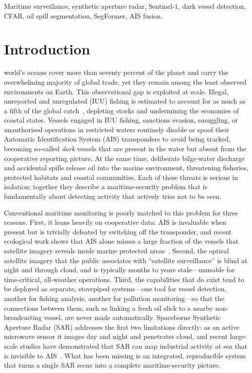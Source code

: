 \documentclass{ieeeaccess}
\begin{document}
\begin{keywords}
Maritime surveillance, synthetic aperture radar, Sentinel-1, dark vessel detection, CFAR, oil spill segmentation, SegFormer, AIS fusion.
\end{keywords}

\titlepgskip=-21pt

\maketitle
\section{Introduction}
\label{sec:introduction}

 world's oceans cover more than seventy percent of the planet and carry the overwhelming majority of global trade, yet they remain among the least observed environments on Earth. This observational gap is exploited at scale. Illegal, unreported and unregulated (IUU) fishing is estimated to account for as much as a fifth of the global catch~\cite{1}, depleting stocks and undermining the economies of coastal states. Vessels engaged in IUU fishing, sanctions evasion, smuggling, or unauthorised operations in restricted waters routinely disable or spoof their Automatic Identification System (AIS) transponders to avoid being tracked, becoming so-called \emph{dark} vessels that are present in the water but absent from the cooperative reporting picture. At the same time, deliberate bilge-water discharge and accidental spills release oil into the marine environment, threatening fisheries, protected habitats and coastal communities. Each of these threats is serious in isolation; together they describe a maritime-security problem that is fundamentally about detecting activity that actively tries not to be seen.

Conventional maritime monitoring is poorly matched to this problem for three reasons. First, it leans heavily on cooperative data: AIS is invaluable when present but is trivially defeated by switching off the transponder, and recent ecological work shows that AIS alone misses a large fraction of the vessels that satellite imagery reveals inside marine protected areas~\cite{2}. Second, the optical satellite imagery that the public associates with ``satellite surveillance'' is blind at night and through cloud, and is typically months to years stale---unusable for time-critical, all-weather operations. Third, the capabilities that do exist tend to be deployed as separate, stovepiped systems---one tool for vessel detection, another for fishing analysis, another for pollution monitoring---so that the connections between them, such as linking a fresh oil slick to a nearby non-broadcasting vessel, are never made automatically. Spaceborne Synthetic Aperture Radar (SAR) addresses the first two limitations directly: as an active microwave sensor it images day and night and penetrates cloud, and recent large-scale studies have demonstrated that SAR can map industrial activity at sea that is invisible to AIS~\cite{3}. What has been missing is an integrated, reproducible system that turns a single SAR scene into a complete maritime-security picture.
\end{document}
